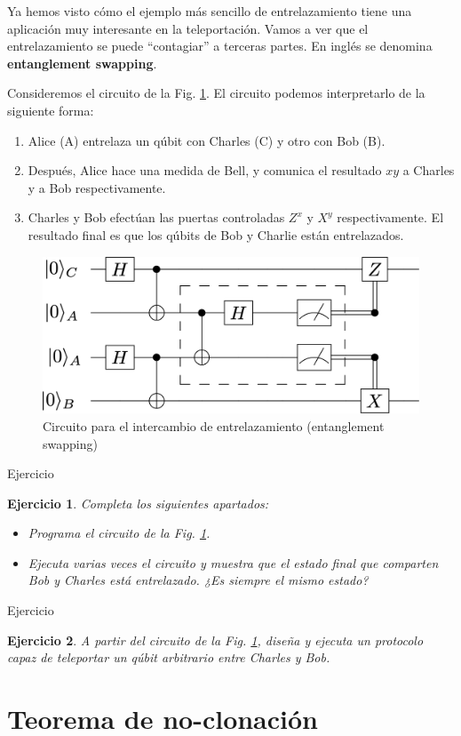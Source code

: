\documentclass[a4paper,11pt]{book} %
\newtheorem{ejercicio_contador}{Ejercicio}
\newcommand{\Ejercicio}[1]{
		\begin{mybox_gray}{Ejercicio} 
			\begin{ejercicio_contador}
				 #1 
			\end{ejercicio_contador} 
		\end{mybox_gray}
	}
\numberwithin{equation}{chapter}
\begin{document}
Ya hemos visto cómo el ejemplo más sencillo de entrelazamiento tiene una aplicación muy interesante en la teleportación. Vamos a ver que el entrelazamiento se puede ``contagiar'' a terceras partes. En inglés se denomina \textbf{entanglement swapping}.

Consideremos el circuito de la Fig. \ref{Fig_entrelazamiento_entanglement_swap}. El circuito podemos interpretarlo de la siguiente forma:
	\begin{enumerate}
		\item Alice (A) entrelaza un qúbit con Charles (C) y otro con Bob (B).
		
		\item Después, Alice hace una medida de Bell, y comunica el resultado $xy$ a Charles 
		y a Bob respectivamente.
		
		\item Charles y Bob efectúan las puertas controladas $Z^x$ y $X^y$ respectivamente. El resultado final es que los qúbits de Bob y Charlie están entrelazados.
	\end{enumerate}


	\begin{figure}[H]
	\centering 
	\includegraphics[width=0.45\linewidth]{Figuras/Fig_entrelazamiento_entanglement_swap}
	\caption{Circuito para el intercambio de entrelazamiento (entanglement swapping)}
	\label{Fig_entrelazamiento_entanglement_swap}
	\end{figure}


	\Ejercicio{Completa los siguientes apartados:
	\begin{itemize}
	\item[a)] Programa el circuito de la Fig. \ref{Fig_entrelazamiento_entanglement_swap}.
	\item[b)] Ejecuta varias veces el circuito y muestra que el estado final que comparten Bob y Charles está entrelazado. ¿Es siempre el mismo estado?
	\end{itemize}}
	
	\Ejercicio{A partir del circuito de la Fig. \ref{Fig_entrelazamiento_entanglement_swap}, diseña y ejecuta un protocolo capaz de teleportar un qúbit arbitrario entre Charles y Bob.}


	\section{Teorema de no-clonación} \label{sec_no_clone}
	
\end{document}
